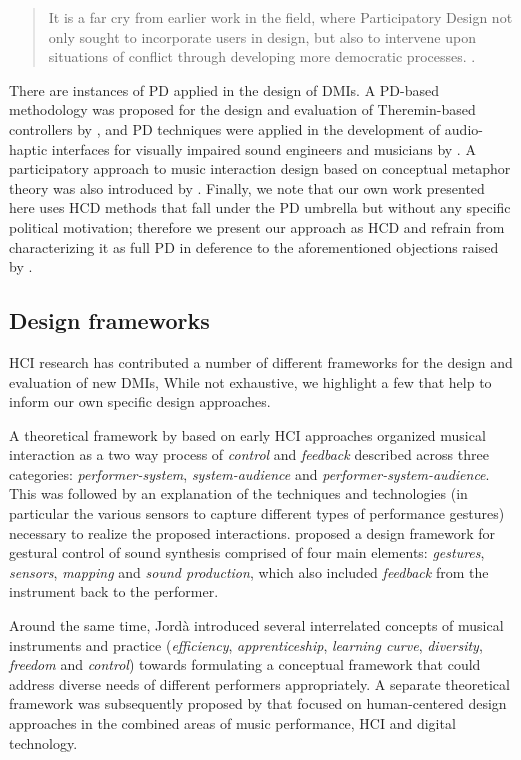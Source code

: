 \documentclass[letterpaper, 12pt]{article}
\begin{document}
\begin{quote}
    It is a far cry from earlier work in the field, where Participatory Design not only sought to incorporate users in design, but also to intervene upon situations of conflict through developing more democratic processes. \citep[p. 2]{Bannon2018}. 
\end{quote}

There are instances of PD applied in the design of DMIs. A PD-based methodology was proposed for the design and evaluation of Theremin-based controllers by \citet{Geiger2008}, and PD techniques were applied in the development of audio-haptic interfaces for visually impaired sound engineers and musicians by \citet{Metatla2016}. A participatory approach to music interaction design based on conceptual metaphor theory was also introduced by \citet{wilkie2013towards}. Finally, we note that our own work presented here uses HCD methods that fall under the PD umbrella but without any specific political motivation; therefore we present our approach as HCD and refrain from characterizing it as full PD in deference to the aforementioned objections raised by \citeauthor{Bannon2018}. 

\subsection{Design frameworks}
\label{ch3-sec:design-frameworks}

HCI research has contributed a number of different frameworks for the design and evaluation of new DMIs, While not exhaustive, we highlight a few that help to inform our own specific design approaches. 

A theoretical framework by \citet{Bongers2000a} based on early HCI approaches organized musical interaction as a two way process of \emph{control} and \emph{feedback} described across three categories: \emph{performer-system}, \emph{system-audience} and \emph{performer-system-audience}. This was followed by an explanation of the techniques and technologies (in particular the various sensors to capture different types of performance gestures) necessary to realize the proposed interactions. \citet{Wanderley2004} proposed a design framework for gestural control of sound synthesis comprised of four main elements: \emph{gestures}, \emph{sensors}, \emph{mapping} and \emph{sound production}, which also included \emph{feedback} from the instrument back to the performer. 

Around the same time, Jordà \citep*{Jorda2004, Jorda2004b} introduced several interrelated concepts of musical instruments and practice (\emph{efficiency}, \emph{apprenticeship}, \emph{learning curve}, \emph{diversity}, \emph{freedom} and \emph{control}) towards formulating a conceptual framework that could address diverse needs of different performers appropriately. A separate theoretical framework was subsequently proposed by \citet{Overholt2009} that focused on human-centered design approaches in the combined areas of music performance, HCI and digital technology.
\end{document}
